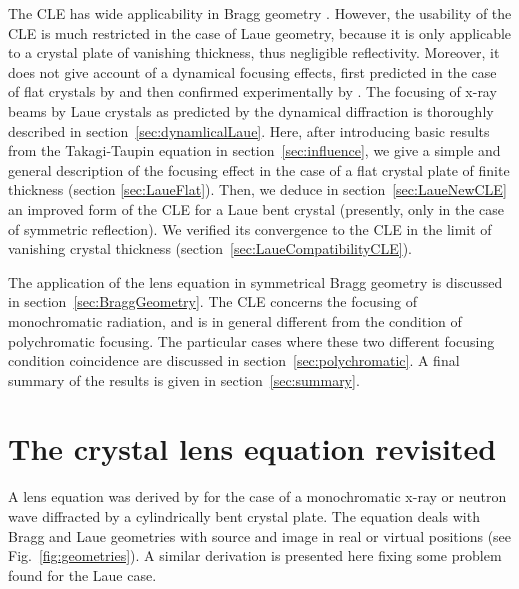 \documentclass[preprint]{iucr}              %
\begin{document}
The CLE has wide applicability in Bragg geometry \cite{Caciuffo1987}. However, the usability of the CLE is much restricted in the case of Laue geometry, because it is only applicable to a crystal plate of vanishing thickness, thus negligible reflectivity. Moreover, it does not give account of a dynamical focusing effects, first  predicted in the case of flat crystals by \cite{AfanasevKohn1977} and then confirmed experimentally by \cite{Aristov1978, Aristov1980}. The focusing of x-ray beams by Laue crystals as predicted by the dynamical diffraction is  thoroughly described in section~\ref{sec:dynamlicalLaue}. Here, after introducing basic results from the Takagi-Taupin equation in section~\ref{sec:influence}, we give a simple and general description of the focusing effect in the case of a flat crystal plate of finite thickness (section \ref{sec:LaueFlat}). Then, we deduce in section~\ref{sec:LaueNewCLE} an improved form of the CLE for a Laue bent crystal (presently, only in the case of symmetric reflection). We verified its convergence to the CLE in the limit of vanishing crystal thickness (section~\ref{sec:LaueCompatibilityCLE}). 

The application of the lens equation in symmetrical Bragg geometry is discussed in section~\ref{sec:BraggGeometry}. %
The CLE concerns the focusing of monochromatic radiation, and is in general different from the condition of polychromatic focusing. The particular cases where these two different focusing condition coincidence  are discussed in section~\ref{sec:polychromatic}. A final summary of the results is given in section~\ref{sec:summary}.   


\section{The crystal lens equation revisited}
\label{sec:CLE}

A lens equation was derived by \cite{CK} for the case of a monochromatic x-ray or neutron wave diffracted by a cylindrically bent crystal plate. The equation deals with Bragg and Laue geometries with source and image in real or virtual positions (see Fig.~\ref{fig:geometries}). A similar derivation is presented here fixing some problem found for the Laue case.
\end{document}
